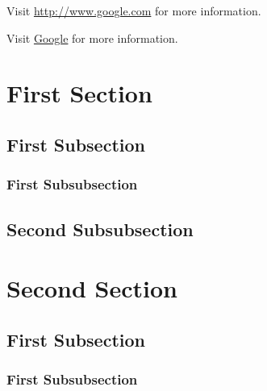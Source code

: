 \documentclass[11pt]{article}
\begin{document}
Visit \url{http://www.google.com} for more information.

Visit \href{http://www.google.com}{Google} for more information.


\section{First Section}

\subsection{First Subsection}

\subsubsection{First Subsubsection}

\subsection{Second Subsubsection}

\section{Second Section}

\subsection{First Subsection}

\subsubsection*{First Subsubsection}


\end{document}
